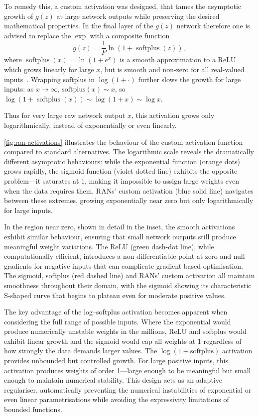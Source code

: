 {{            To remedy this, a custom activation was designed, that tames the asymptotic growth of $g(z)$ at large network outputs while preserving the desired mathematical properties.
            In the final layer of the $g(z)$ network therefore one is advised to replace the $\exp$ with a composite function
            \[
                g(z) = \frac1P\ln(1 + \operatorname{softplus}(z)),
            \]
            where $\operatorname{softplus}(x) = \ln(1+e^x)$ is a smooth approximation to a ReLU which grows linearly for large $x$, but is smooth and non-zero for all real-valued inputs~\cite{dugas_incorporating_2000, glorot_deep_2011}.
            Wrapping softplus in $\log(1+\cdot)$ further slows the growth for large inputs: as $x \to \infty$, $\mathrm{softplus}(x)\sim x$, so $\log(1+\operatorname{softplus}(x)) \sim \log(1+x) \sim \log x$.
            
            Thus for very large raw network output $x$, this activation grows only logarithmically, instead of exponentially or even linearly.
            
\cref{fig:ran-activations} illustrates the behaviour of the custom activation function compared to standard alternatives. The logarithmic scale reveals the dramatically different asymptotic behaviours: while the exponential function (orange dots) grows rapidly, the sigmoid function (violet dotted line) exhibits the opposite problem---it saturates at 1, making it impossible to assign large weights even when the data requires them. RANs' custom activation (blue solid line) navigates between these extremes, growing exponentially near zero but only logarithmically for large inputs.

In the region near zero, shown in detail in the inset, the smooth activations exhibit similar behaviour, ensuring that small network outputs still produce meaningful weight variations. The ReLU (green dash-dot line), while computationally efficient, introduces a non-differentiable point at zero and null gradients for negative inputs that can complicate gradient based optimisation.
%
The sigmoid, softplus (red dashed line) and RANs' custom activation all maintain smoothness throughout their domain, with the sigmoid showing its characteristic S-shaped curve that begins to plateau even for moderate positive values.

The key advantage of the log--softplus activation becomes apparent when considering the full range of possible inputs. Where the exponential would produce numerically unstable weights in the millions, ReLU and softplus would exhibit linear growth and the sigmoid would cap all weights at 1 regardless of how strongly the data demands larger values. The $\log(1 + \text{softplus})$ activation provides unbounded but controlled growth. For large positive inputs, this activation produces weights of order 1---large enough to be meaningful but small enough to maintain numerical stability.
%
This design acts as an adaptive regulariser, automatically preventing the numerical instabilities of exponential or even linear parametrisations while avoiding the expressivity limitations of bounded functions.

}}
